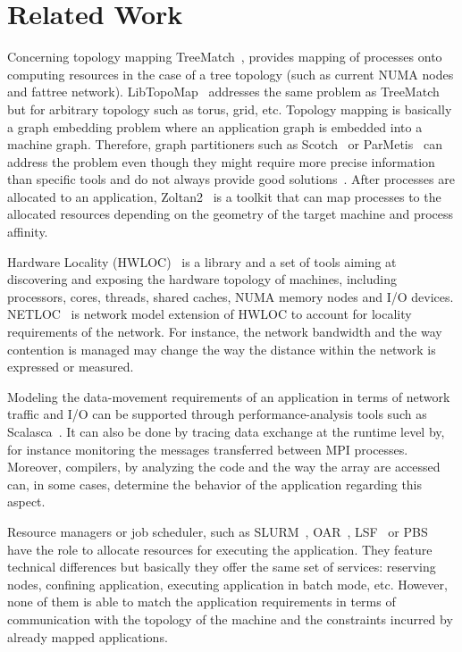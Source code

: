 \section{Related Work}
Concerning topology mapping TreeMatch~\cite{jmt14b}, provides mapping
of processes onto computing resources in the case of a tree topology (such as
current NUMA nodes and fattree
network). LibTopoMap~\cite{DBLP:conf/ics/HoeflerS11} addresses the same problem as
TreeMatch but for arbitrary topology such as torus, grid,
etc. Topology mapping is basically a graph embedding problem 
where an application graph is embedded into a machine graph.  Therefore, graph partitioners 
such as Scotch~\cite{scotch-man} or ParMetis~\cite{karypis2003parmetis} can address the
problem even though they might require more precise information than specific
tools and do not always provide good solutions~\cite{jmt14b}.  
After processes are allocated to an application, Zoltan2~\cite{zoltan2,drl+14} is a 
toolkit that can map processes to the allocated resources depending on the geometry of the 
target machine and process affinity.


Hardware Locality (HWLOC)~\cite{hwloc} is a library and a set of tools aiming at
discovering and exposing the hardware topology of machines, including
processors, cores, threads, shared caches, NUMA memory nodes and I/O devices.
NETLOC~\cite{netloc} is network model extension of HWLOC to account for locality
requirements of the network. For instance, the network bandwidth and the way
contention is managed may change the way the distance within the network is
expressed or measured. 

Modeling the data-movement requirements of an application in terms of
network traffic and I/O can be supported through performance-analysis tools
such as Scalasca~\cite{geimer_ea:2010:scalascaarchitecture}. It can also be done
by tracing data exchange at the runtime level by, for instance monitoring the
messages transferred between MPI processes. Moreover, compilers, by analyzing
the code and the way the array are accessed can, in some cases, determine the
behavior of the application regarding this aspect. 

Resource managers or job scheduler, such as SLURM~\cite{yoo2003slurm},
OAR~\cite{capit2005batch,}, LSF~\cite{zhou1992lsf}
or PBS~\cite{henderson1995job} have the role to allocate resources for executing the
application. They feature technical differences but basically they offer the
same set of services: reserving nodes, confining application, executing
application in batch mode, etc. However, none of them is able to match the
application requirements in terms of communication with the topology of the
machine and the constraints incurred by already mapped applications. 


